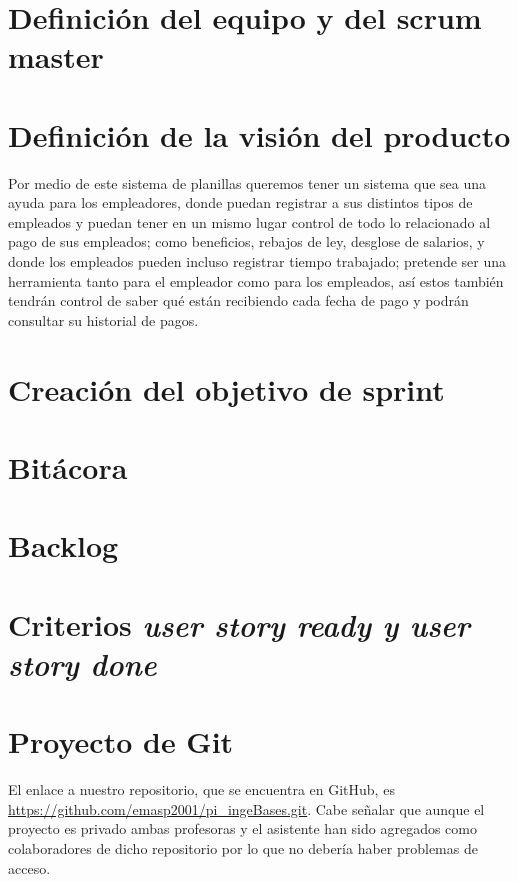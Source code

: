 \documentclass{article}
\begin{document}
\newpage
\tableofcontents

\newpage


\newpage
\section{Definición del equipo y del scrum master}

\section{Definición de la visión del producto}
Por medio de este sistema de planillas queremos tener un sistema que sea
una ayuda para los empleadores, donde puedan registrar a sus distintos tipos
de empleados y puedan tener en un mismo lugar control de todo lo relacionado
al pago de sus empleados; como beneficios, rebajos de ley, desglose de salarios,
y donde los empleados pueden incluso registrar tiempo trabajado; pretende
ser una herramienta tanto para el empleador como para los empleados, así
estos también tendrán control de saber qué están recibiendo cada fecha de pago
y podrán consultar su historial de pagos.

\section{Creación del objetivo de sprint}

\section{Bitácora}

\section{Backlog}

\section{Criterios \textit{user story ready y user story done}}

\section{Proyecto de Git}
El enlace a nuestro repositorio, que se encuentra en GitHub, es
\url{https://github.com/emasp2001/pi_ingeBases.git}. Cabe señalar que
aunque el proyecto es privado ambas profesoras y el asistente han sido
agregados como colaboradores de dicho repositorio por lo que no debería
haber problemas de acceso.
\end{document}
